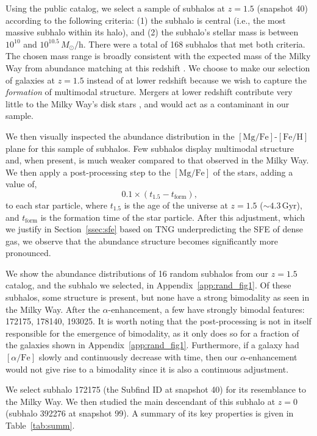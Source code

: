 \documentclass[twocolumn,linenumbers]{aastex631}
\newcommand{\Msun}{\ensuremath{M_{\odot}}}
\newcommand{\Gyr}{\ensuremath{\textrm{Gyr}}}
\newcommand{\FeH}{\ensuremath{[\textrm{Fe}/\textrm{H}]}}
\newcommand{\MgFe}{\ensuremath{[\textrm{Mg}/\textrm{Fe}]}}
\newcommand{\alphaFe}{\ensuremath{[\alpha/\textrm{Fe}]}}
\begin{document}
Using the public catalog, we select a sample of subhalos at $z=1.5$ (snapshot 40) according to the following criteria: (1) the subhalo is central (i.e., the most massive subhalo within its halo), and (2) the subhalo's stellar mass is between $10^{10}$ and $10^{10.5}\,\Msun/\textrm{h}$. There were a total of 168 subhalos that met both criteria. The chosen mass range is broadly consistent with the expected mass of the Milky Way from abundance matching at this redshift \citep{2013ApJ...771L..35V}. We choose to make our selection of galaxies at $z=1.5$ instead of at lower redshift because we wish to capture the \textit{formation} of multimodal structure. Mergers at lower redshift contribute very little to the Milky Way's disk stars \citep[e.g.,][]{2016ARA&A..54..529B}, and would act as a contaminant in our sample.

We then visually inspected the abundance distribution in the \MgFe{}-\FeH{} plane for this sample of subhalos. Few subhalos display multimodal structure and, when present, is much weaker compared to that observed in the Milky Way. We then apply a post-processing step to the \MgFe{} of the stars, adding a value of,
\begin{equation*}
  0.1\times\left(t_{1.5}-t_{\textrm{form}}\right)\textrm{,}
\end{equation*}
to each star particle, where $t_{1.5}$ is the age of the universe at $z=1.5$ ($\sim4.3\,\Gyr$), and $t_{\textrm{form}}$ is the formation time of the star particle. After this adjustment, which we justify in Section~\ref{ssec:sfe} based on TNG underpredicting the SFE of dense gas, we observe that the abundance structure becomes significantly more pronounced.

We show the abundance distributions of 16 random subhalos from our $z=1.5$ catalog, and the subhalo we selected, in Appendix~\ref{app:rand_fig1}. Of these subhalos, some structure is present, but none have a strong bimodality as seen in the Milky Way. After the $\alpha$-enhancement, a few have strongly bimodal features: 172175, 178140, 193025. It is worth noting that the post-processing is not in itself responsible for the emergence of bimodality, as it only does so for a fraction of the galaxies shown in Appendix~\ref{app:rand_fig1}. Furthermore, if a galaxy had \alphaFe{} slowly and continuously decrease with time, then our $\alpha$-enhancement would not give rise to a bimodality since it is also a continuous adjustment.

We select subhalo 172175 (the Subfind ID at snapshot 40) for its resemblance to the Milky Way. We then studied the main descendant of this subhalo at $z=0$ (subhalo 392276 at snapshot 99). A summary of its key properties is given in Table~\ref{tab:summ}.
\end{document}
